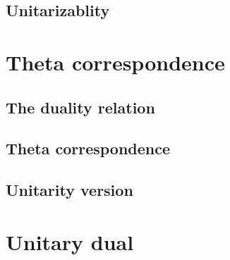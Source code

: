 \documentclass[11pt]{beamer}
\begin{document}
\subsection{Unitarizablity}
\frame{
  \frametitle{\subsecname}
  
}


\section{Theta correspondence}
\subsection{The duality relation}

\frame{
 \frametitle{\subsecname}

}

\subsection{Theta correspondence}
\frame{
 \frametitle{\subsecname}

}

\subsection{Unitarity version}
\frame{
 \frametitle{\subsecname}

}

\section{Unitary dual}



\end{document}
